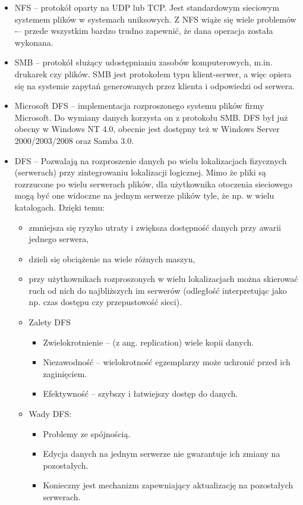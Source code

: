 \begin{itemize}
    \item NFS -- protokół oparty na UDP lub TCP. Jest standardowym sieciowym systemem plików w systemach uniksowych. Z NFS wiąże się wiele problemów -– przede wszystkim bardzo trudno zapewnić, że dana operacja została wykonana.
    \item SMB --  protokół służący udostępnianiu zasobów komputerowych, m.in. drukarek czy plików. SMB jest protokołem typu klient-serwer, a więc opiera się na systemie zapytań generowanych przez klienta i odpowiedzi od serwera. 
    \item Microsoft DFS -- implementacja rozproszonego systemu plików firmy Microsoft. Do wymiany danych korzysta on z protokołu SMB. DFS był już obecny w Windows NT 4.0, obecnie jest dostępny też w Windows Server 2000/2003/2008 oraz Samba 3.0.
	\item DFS – Pozwalają na rozproszenie danych po wielu lokalizacjach fizycznych (serwerach) przy zintegrowaniu lokalizacji logicznej. Mimo że pliki są rozrzucone po wielu serwerach plików, dla użytkownika otoczenia sieciowego mogą być one widoczne na jednym serwerze plików tyle, że np. w wielu katalogach. Dzięki temu:
	\begin{itemize}
		\item   zmniejsza się ryzyko utraty i zwiększa dostępność danych przy awarii jednego serwera,
		\item   dzieli się obciążenie na wiele różnych maszyn,
		\item  przy użytkownikach rozproszonych w wielu lokalizacjach można skierować ruch od nich do najbliższych im serwerów (odległość interpretując jako np. czas dostępu czy przepustowość sieci).
		\item Zalety DFS
		\begin{itemize}
			\item Zwielokrotnienie -- (z ang. replication) wiele kopii danych.
			\item Niezawodność -- wielokrotność egzemplarzy może uchronić przed ich zaginięciem.
			\item Efektywność -- szybszy i łatwiejszy dostęp do danych.
		\end{itemize}
		\item Wady DFS:
		\begin{itemize}
			\item Problemy ze spójnością.
			\item Edycja danych na jednym serwerze nie gwarantuje ich zmiany na pozostałych.
			\item Konieczny jest mechanizm zapewniający aktualizację na pozostałych serwerach.

\end{itemize}
\end{itemize}
\end{itemize}
